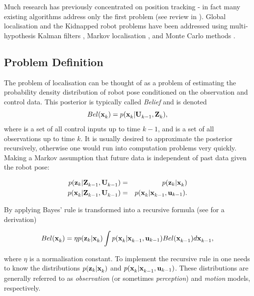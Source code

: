 Much research has previously concentrated on position tracking - in
fact many existing algorithms address only the first problem (see
review in \cite{Borenstein96}). Global localisation and the Kidnapped
robot problems have been addressed using multi-hypothesis Kalman
filters \cite{JensfeltKristensen01,Cox94}, Markov localisation
\cite{Fox99}, and Monte Carlo methods \cite{Thrun00j}.


\subsection{Problem Definition}

The problem of localisation can be thought of as a problem of
estimating the probability density distribution of robot pose
conditioned on the observation and control data.  This posterior is
typically called {\it Belief} and is denoted
\begin{equation}
  Bel(\x{k}{}{}) = p(\x{k}{}{} | \Uall{k-1}{}, \Zall{k}{}),
\label{eqn:localise_belief}
\end{equation}
where  is a set of all control inputs up to time $k-1$, and
 is a set of all observations up to time $k$. It is usually
desired to approximate the posterior recursively, otherwise one would
run into computation problems very quickly. Making a Markov
assumption that future data is independent of past data given the
robot pose:

\begin{eqnarray}
 p(\z{k} | \Zall{k-1}{}, \Uall{k-1}{})    &=& p(\z{k} | \x{k}{}{}) \\
 p(\x{k}{}{} | \Zall{k-1}{}, \Uall{k-1}{})&=& p(\x{k}{}{} | \x{k-1}{}{}, \U{k-1}{}).
\end{eqnarray}

By applying Bayes' rule  is transformed
into a recursive formula (see \cite{Thrun00j} for a derivation)

\begin{equation}
Bel(\x{k}{}{}) = \eta p(\z{k} | \x{k}{}{}) \int 
                     p(\x{k}{}{} | \x{k-1}{}{}, \U{k-1}{}) 
                     Bel(\x{k-1}{}{}) d \x{k-1}{}{},
\label{eqn:localise_recursion}
\end{equation}

where $\eta$ is a normalisation constant. To implement the recursive
rule in  one needs to know the
distributions $p(\z{k} | \x{k}{}{})$ and $p(\x{k}{}{} | \x{k-1}{}{},
\U{k-1}{})$. These distributions are generally referred to as {\it
observation} (or sometimes {\it perception}) and {\it motion} models,
respectively. 

